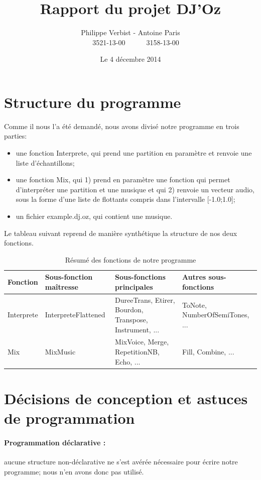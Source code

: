 \documentclass[10pt,a4paper]{article}
\author{Philippe Verbist - Antoine Paris \\ \ \ \ 3521-13-00\ \ \ \ \ \ 3158-13-00}
\title{\textbf{Rapport du projet DJ'Oz}}
\date{Le 4 décembre 2014}
\begin{document}
\sloppy
\maketitle


\section{Structure du programme}
Comme il nous l'a été demandé, nous avons divisé notre programme en trois parties:
\begin{itemize}
	\item une fonction Interprete, qui prend une partition en paramètre et renvoie une liste d'échantillons;
	\item une fonction Mix, qui 1) prend en paramètre une fonction qui permet d'interpréter une partition 
	et une musique et qui  2) renvoie un vecteur audio, sous la forme d'une liste de flottants compris dans l'intervalle [-1.0;1.0];
	\item un fichier example.dj.oz, qui contient une musique.
\end{itemize}
\vspace{0.5 cm}

Le tableau suivant reprend de manière synthétique la structure de nos deux fonctions.

	\begin{table}[ht!]
		\centering
			\begin{tabular}{|p{}|p{}|p{0.25\textwidth}|p{}|}
			\hline
			\textbf{Fonction}		& \textbf{Sous-fonction maîtresse}& \textbf{Sous-fonctions principales} & \textbf{Autres sous-fonctions}	\\
			\hline
Interprete		&InterpreteFlattened	& DureeTrans, Etirer, Bourdon, Transpose, Instrument, ... & ToNote, NumberOfSemiTones, ...\\
			\hline
Mix 	& MixMusic &  MixVoice, Merge, RepetitionNB, Echo, ... &  Fill, Combine, ...\\
			\hline 
			\end{tabular}
		\caption{Résumé des fonctions de notre programme}
	\end{table}

\section{Décisions de conception et astuces de programmation}
\paragraph{Programmation déclarative :} 
aucune structure non-déclarative ne s'est avérée nécessaire
pour écrire notre programme; nous n'en avons donc pas utilisé.
\end{document}
